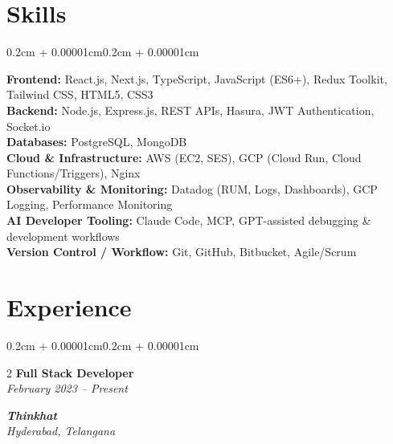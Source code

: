 \documentclass[10pt, letterpaper]{article}
\newenvironment{onecolentry}{
    \begin{adjustwidth}{0.2cm + 0.00001cm}{0.2cm + 0.00001cm}
}{
    \end{adjustwidth}
}
\newenvironment{twocolentry}[2][]{
    \onecolentry
    \def\secondColumn{#2}
    \setcolumnwidth{\fill, 4.5cm}
    \begin{paracol}{2}
}{
    \switchcolumn \raggedleft \secondColumn
    \end{paracol}
    \endonecolentry
}
\begin{document}
\section{Skills}
\begin{onecolentry}
    \textbf{Frontend:} React.js, Next.js, TypeScript, JavaScript (ES6+), Redux Toolkit, Tailwind CSS, HTML5, CSS3 \\[4pt]
    \textbf{Backend:} Node.js, Express.js, REST APIs, Hasura, JWT Authentication, Socket.io  \\[4pt]
    \textbf{Databases:} PostgreSQL, MongoDB \\[4pt]
    \textbf{Cloud \& Infrastructure:} AWS (EC2, SES), GCP (Cloud Run, Cloud Functions/Triggers), Nginx \\[4pt]
    \textbf{Observability \& Monitoring:} Datadog (RUM, Logs, Dashboards), GCP Logging, Performance Monitoring \\[4pt]
    \textbf{AI Developer Tooling:} Claude Code, MCP, GPT-assisted debugging \& development workflows \\[4pt]
    \textbf{Version Control / Workflow:} Git, GitHub, Bitbucket, Agile/Scrum
\end{onecolentry}

\section{Experience}

\begin{twocolentry}{
    \textbf{\textit{Thinkhat}} \\
    \textit{Hyderabad, Telangana}
}{
    \textbf{Full Stack Developer} \\
    \textit{February 2023 – Present}
}
\end{twocolentry}
\end{document}
